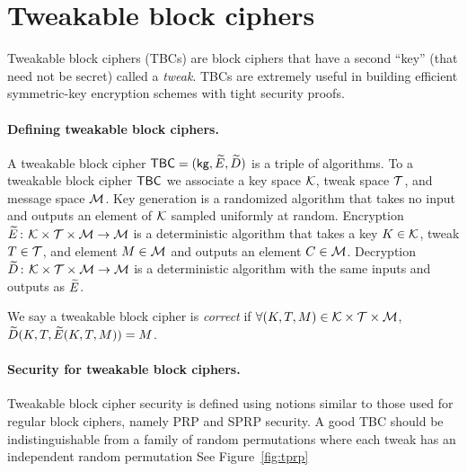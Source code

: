 



\section{Tweakable block ciphers}
\label{sec:tbcs}

Tweakable block ciphers (TBCs) are block ciphers that have a second ``key'' (that need not be secret) called a \emph{tweak}. TBCs are extremely useful in building efficient symmetric-key encryption schemes with tight security proofs.




\paragraph{Defining tweakable block ciphers.} A tweakable block cipher $\mathsf{TBC} = ({\sf kg}, \widetilde{E}, \widetilde{D})$ is a triple of 
algorithms. To a tweakable block cipher $\mathsf{TBC}$ we associate a key space ${\cal K}$, tweak space $\mathcal{T}$, and message space ${\cal M}$. Key generation is a randomized algorithm that takes no input and outputs an element of ${\cal K}$ sampled uniformly at random. Encryption $\widetilde{E}{{\kern .05em}\colon{\kern .05em}}{\cal K}\times\mathcal{T}\times{\cal M}\rightarrow{\cal M}$ is a deterministic algorithm that takes a key $K\in{\cal K}$, tweak $T\in\mathcal{T}$, and element $M\in{\cal M}$ and outputs an element $C\in{\cal M}$. Decryption $\widetilde{D}{{\kern .05em}\colon{\kern .05em}}{\cal K}\times\mathcal{T}\times{\cal M}\rightarrow{\cal M}$ is a deterministic algorithm with the same inputs and outputs as $\widetilde{E}$.

We say a tweakable block cipher is \emph{correct} if $\forall (K, T, M)\in{\cal K}\times\mathcal{T}\times{\cal M}$, $\widetilde{D}(K, T, \widetilde{E}(K, T, M))=M$.

\paragraph{Security for tweakable block ciphers.}

Tweakable block cipher security is defined using notions similar to those used for regular block ciphers, namely PRP and SPRP security. A good TBC should be indistinguishable from a family of random permutations where each tweak has an independent random permutation See Figure~\ref{fig:tprp}

